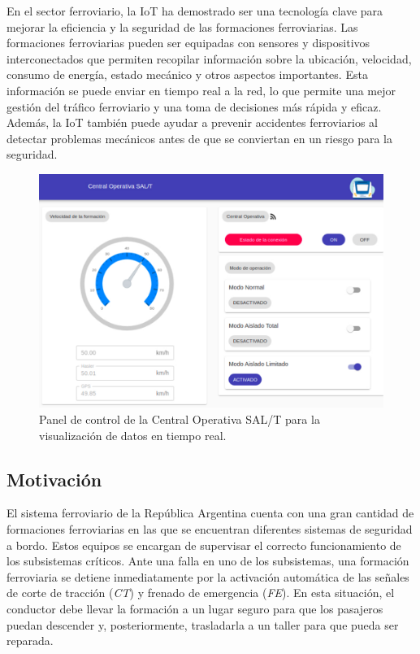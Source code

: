 En el sector ferroviario, la IoT ha demostrado ser una tecnología clave para mejorar la eficiencia y la seguridad de las formaciones ferroviarias. Las formaciones ferroviarias pueden ser equipadas con sensores y dispositivos interconectados que permiten recopilar información sobre la ubicación, velocidad, consumo de energía, estado mecánico y otros aspectos importantes. Esta información se puede enviar en tiempo real a la red, lo que permite una mejor gestión del tráfico ferroviario y una toma de decisiones más rápida y eficaz. Además, la IoT también puede ayudar a prevenir accidentes ferroviarios al detectar problemas mecánicos antes de que se conviertan en un riesgo para la seguridad.


\vspace{1cm}

\begin{figure}[htpb]
	\centering
	\includegraphics[width=.75\textwidth]{./Figures/dashboard.jpeg}
	\caption{Panel de control de la Central Operativa SAL/T para la visualización de datos en tiempo real.}
	\label{fig:dashboard}
\end{figure}


\subsection{Motivación}

El sistema ferroviario de la República Argentina cuenta con una gran cantidad de formaciones ferroviarias en las que se encuentran diferentes sistemas de seguridad a bordo. Estos equipos se encargan de supervisar el correcto funcionamiento de los subsistemas críticos. Ante una falla en uno de los subsistemas, una formación ferroviaria se detiene inmediatamente por la activación automática de las señales de corte de tracción (\textit{CT}) y frenado de emergencia (\textit{FE}). En esta situación, el conductor debe llevar la formación a un lugar seguro para que los pasajeros puedan descender y, posteriormente, trasladarla a un taller para que pueda ser reparada.

